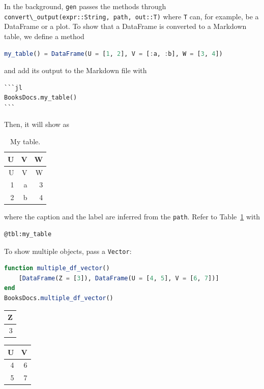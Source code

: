 \documentclass[
  notoc %
]{tufte-book}
\newcommand{\passthrough}[1]{#1}
\begin{document}
In the background, \passthrough{\lstinline!gen!} passes the methods
through
\passthrough{\lstinline!convert\_output(expr::String, path, out::T)!}
where \passthrough{\lstinline!T!} can, for example, be a DataFrame or a
plot. To show that a DataFrame is converted to a Markdown table, we
define a method

\begin{lstlisting}[language=Julia]
my_table() = DataFrame(U = [1, 2], V = [:a, :b], W = [3, 4])
\end{lstlisting}

and add its output to the Markdown file with

\begin{lstlisting}
```jl
BooksDocs.my_table()
```
\end{lstlisting}

Then, it will show as

\hypertarget{tbl:my_table}{}
\begin{longtable}[]{@{}rrr@{}}
\caption{\label{tbl:my_table}My table.}\tabularnewline
\toprule
U & V & W \\
\midrule
\endfirsthead
\toprule
U & V & W \\
\midrule
\endhead
1 & a & 3 \\
2 & b & 4 \\
\bottomrule
\end{longtable}

where the caption and the label are inferred from the
\passthrough{\lstinline!path!}. Refer to Table~\ref{tbl:my_table} with

\begin{lstlisting}
@tbl:my_table
\end{lstlisting}

To show multiple objects, pass a \passthrough{\lstinline!Vector!}:

\begin{lstlisting}[language=Julia]
function multiple_df_vector()
    [DataFrame(Z = [3]), DataFrame(U = [4, 5], V = [6, 7])]
end
BooksDocs.multiple_df_vector()
\end{lstlisting}

\begin{longtable}[]{@{}r@{}}
\toprule
Z \\
\midrule
\endhead
3 \\
\bottomrule
\end{longtable}

\begin{longtable}[]{@{}rr@{}}
\toprule
U & V \\
\midrule
\endhead
4 & 6 \\
5 & 7 \\
\bottomrule
\end{longtable}
\end{document}
